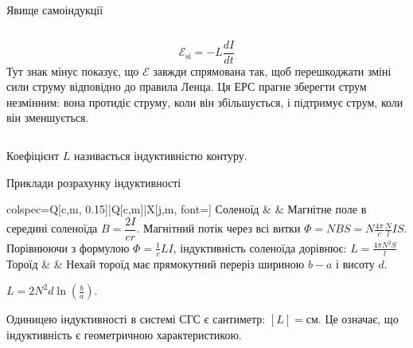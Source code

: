 \documentclass[onlytextwidth]{beamer}
\begin{document}
\begin{frame}{Явище самоіндукції}{}
\begin{columns}
\begin{column}{0.65\linewidth}
\begin{onlyenv}
\begin{block}{}
                    \begin{equation*}
                        \mathcal{E}_\text{si} = - L\frac{dI}{dt}
                    \end{equation*}
                      {\scriptsize Тут знак мінус показує, що $\mathcal{E}$ завжди спрямована так, щоб перешкоджати зміні сили струму відповідно до
                      правила Ленца. Ця ЕРС прагне зберегти струм незмінним: вона протидіє струму, коли він збільшується, і підтримує струм, коли він
                      зменшується.}
    			\end{block}
            \end{onlyenv}
		\end{column}
	\end{columns}
\begin{block}{}
Коефіцієнт $L$ називається \alert{індуктивністю контуру}.
\end{block}
\end{frame}


\begin{frame}{Приклади розрахунку індуктивності}{}
       \begin{tblr}{colspec={Q[c,m, 0.15\linewidth]|Q[c,m]|X[j,m, font=\small]}}
			Соленоїд
			 &
            &
			Магнітне поле в середині соленоїда $B = \dfrac{2I}{c r}$. Магнітний потік через всі витки
            $\Phi = NBS =  N \frac{4\pi}c\frac{N}{l} I S$. Порівнюючи з формулою $\Phi = \frac1c LI$, індуктивність соленоїда дорівнює: $L = \frac{4\pi
            N^2 S}{l}$
			\\\hline
			Тороїд
			 &
            &
            Нехай тороїд має прямокутний переріз шириною $b-a$ і висоту $d$.

            $L = 2N^2d\ln\left( \frac{b}{a}\right) $.
		\end{tblr}
\begin{block}{}\justifying
    Одиницею індуктивності в системі СГС є сантиметр: $[L] = \text{см}$. Це означає, що індуктивність є \alert{геометричною} характеристикою.
\end{block}
\end{frame}
\end{document}
